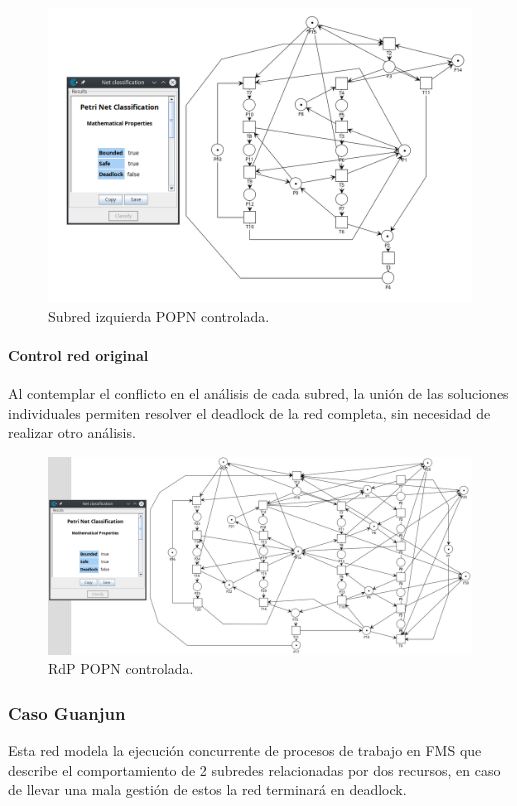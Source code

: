 \begin{figure}[H]
	\centering
	\includegraphics[scale=0.5]{Figures/algoritmo3/POP5.png}
	\caption{Subred izquierda POPN controlada.}
	\label{fig:popnredizqcontrolada}
 \end{figure}
 
 \paragraph{Control red original}
 \hfill \break
Al contemplar el conflicto en el análisis de cada subred, la unión de las soluciones individuales permiten resolver el deadlock de la red completa, sin necesidad de realizar otro análisis.\\
\bigskip

\begin{figure}[H]
	\centering
	\includegraphics[width=\textwidth]{Figures/algoritmo3/POP6.png}
	\caption{RdP POPN controlada.}
	\label{fig:popncontrolada}
 \end{figure}
\bigskip

\subsubsection{Caso Guanjun} \label{sec:guanjun}
Esta red modela la ejecución concurrente de procesos de trabajo en FMS que describe el comportamiento de 2 subredes relacionadas por dos recursos, en caso de llevar una mala gestión de estos la red terminará en deadlock.
\bigskip

